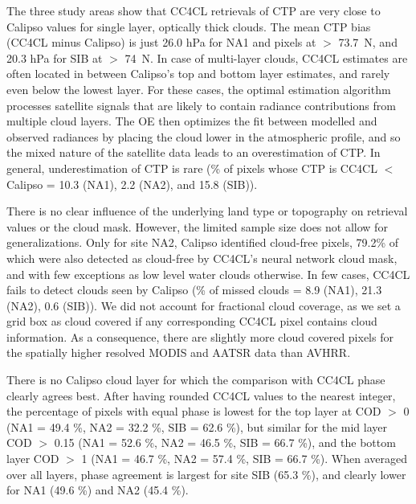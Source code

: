 The three study areas show that CC4CL retrievals of CTP are very close to Calipso values for single layer, optically thick clouds. The mean CTP bias (CC4CL minus Calipso) is just 26.0 hPa for NA1 and pixels at $>$ 73.7\textdegree\ N, and 20.3 hPa for SIB at $>$ 74\textdegree\ N. In case of multi-layer clouds, CC4CL estimates are often located in between Calipso's top and bottom layer estimates, and rarely even below the lowest layer. For these cases, the optimal estimation algorithm processes satellite signals that are likely to contain radiance contributions from multiple cloud layers. The OE then optimizes the fit between modelled and observed radiances by placing the cloud lower in the atmospheric profile, and so the mixed nature of the satellite data leads to an overestimation of CTP. In general, underestimation of CTP is rare (\% of pixels whose CTP is CC4CL $<$ Calipso = 10.3 (NA1), 2.2 (NA2), and 15.8 (SIB)).

There is no clear influence of the underlying land type or topography on retrieval values or the cloud mask. However, the limited sample size does not allow for generalizations. Only for site NA2, Calipso identified cloud-free pixels, 79.2\% of which were also detected as cloud-free by CC4CL's neural network cloud mask, and with few exceptions as low level water clouds otherwise. In few cases, CC4CL fails to detect clouds seen by Calipso (\% of missed clouds = 8.9 (NA1), 21.3 (NA2), 0.6 (SIB)). We did not account for fractional cloud coverage, as we set a grid box as cloud covered if any corresponding CC4CL pixel contains cloud information. As a consequence, there are slightly more cloud covered pixels for the spatially higher resolved MODIS and AATSR data than AVHRR.

There is no Calipso cloud layer for which the comparison with CC4CL phase clearly agrees best. After having rounded CC4CL values to the nearest integer, the percentage of pixels with equal phase is lowest for the top layer at COD $>$ 0 (NA1 = 49.4 \%, NA2 = 32.2 \%, SIB = 62.6 \%), but similar for the mid layer COD $>$ 0.15 (NA1 = 52.6 \%, NA2 = 46.5 \%, SIB = 66.7 \%), and the bottom layer COD $>$ 1 (NA1 = 46.7 \%, NA2 = 57.4 \%, SIB = 66.7 \%). When averaged over all layers, phase agreement is largest for site SIB (65.3 \%), and clearly lower for NA1 (49.6 \%) and NA2 (45.4 \%).

